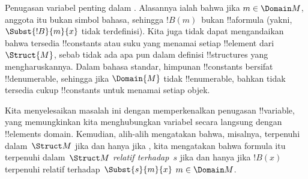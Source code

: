 \documentclass[../../../include/open-logic-section]{subfiles}
\begin{document}
\begin{explain}
Penugasan variabel penting dalam
. Alasannya ialah
bahwa jika $m \in \Domain M$, anggota itu bukan simbol bahasa, sehingga
$!B(m)$~bukan !!a{formula} (yakni, $\Subst{!B}{m}{x}$ tidak terdefinisi).
Kita juga tidak dapat mengandaikan bahwa tersedia !!{constant}s atau suku
yang menamai setiap !!{element} dari~$\Struct{M}$, sebab tidak ada apa pun
dalam definisi !!{structure}s yang mengharuskannya. Dalam bahasa standar,
himpunan !!{constant}s bersifat !!{denumerable}, sehingga jika
$\Domain{M}$ tidak !!{enumerable}, bahkan tidak tersedia cukup
!!{constant}s untuk menamai setiap objek.

Kita menyelesaikan masalah ini dengan memperkenalkan penugasan
!!{variable}, yang memungkinkan kita menghubungkan variabel secara langsung
dengan !!{element}s domain. Kemudian, alih-alih mengatakan bahwa, misalnya,
 terpenuhi
dalam~$\Struct M$ jika dan hanya jika , kita mengatakan bahwa formula itu terpenuhi
dalam~$\Struct M$ \emph{relatif terhadap}~$s$ jika dan hanya jika $!B(x)$
terpenuhi relatif terhadap~$\Subst{s}{m}{x}$
 $m \in \Domain M$.
\end{explain}
\end{document}
